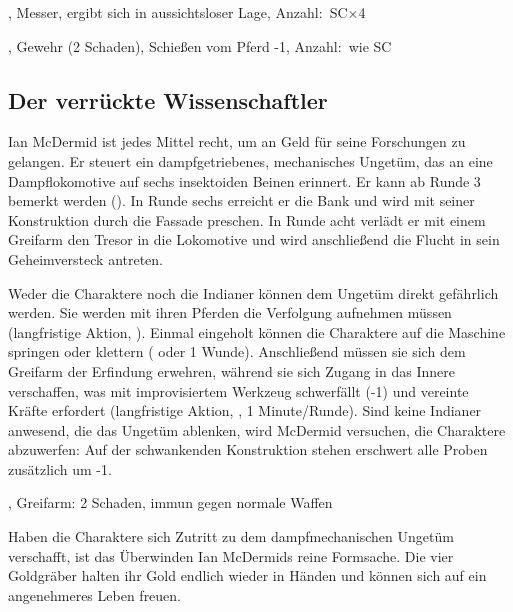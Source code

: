{		, Messer, ergibt sich in aussichtsloser Lage, Anzahl:~SC×4

		, Gewehr (2 Schaden), Schießen vom Pferd -1, Anzahl:~wie SC

		\subsection{Der verrückte Wissenschaftler}

		Ian McDermid ist jedes Mittel recht, um an Geld für seine Forschungen zu gelangen. Er steuert ein dampfgetriebenes, mechanisches Ungetüm, das an eine Dampflokomotive auf sechs insektoiden Beinen erinnert. Er kann ab Runde 3 bemerkt werden (). In Runde sechs erreicht er die Bank und wird mit seiner Konstruktion durch die Fassade preschen. In Runde acht verlädt er mit einem Greifarm den Tresor in die Lokomotive und wird anschließend die Flucht in sein Geheimversteck antreten.

		Weder die Charaktere noch die Indianer können dem Ungetüm direkt gefährlich werden. Sie werden mit ihren Pferden die Verfolgung aufnehmen müssen (langfristige Aktion, ). Einmal eingeholt können die Charaktere auf die Maschine springen oder klettern ( oder 1 Wunde). Anschließend müssen sie sich dem Greifarm der Erfindung erwehren, während sie sich Zugang in das Innere verschaffen, was mit improvisiertem Werkzeug schwerfällt (-1) und vereinte Kräfte erfordert (langfristige Aktion, , 1 Minute/Runde). Sind keine Indianer anwesend, die das Ungetüm ablenken, wird McDermid versuchen, die Charaktere abzuwerfen: Auf der schwankenden Konstruktion stehen erschwert alle Proben zusätzlich um -1.

		, Greifarm: 2 Schaden, immun gegen normale Waffen



		\noindent
		Haben die Charaktere sich Zutritt zu dem dampfmechanischen Ungetüm verschafft, ist das Überwinden Ian McDermids reine Formsache. Die vier Goldgräber halten ihr Gold endlich wieder in Händen und können sich auf ein angenehmeres Leben freuen.
}
